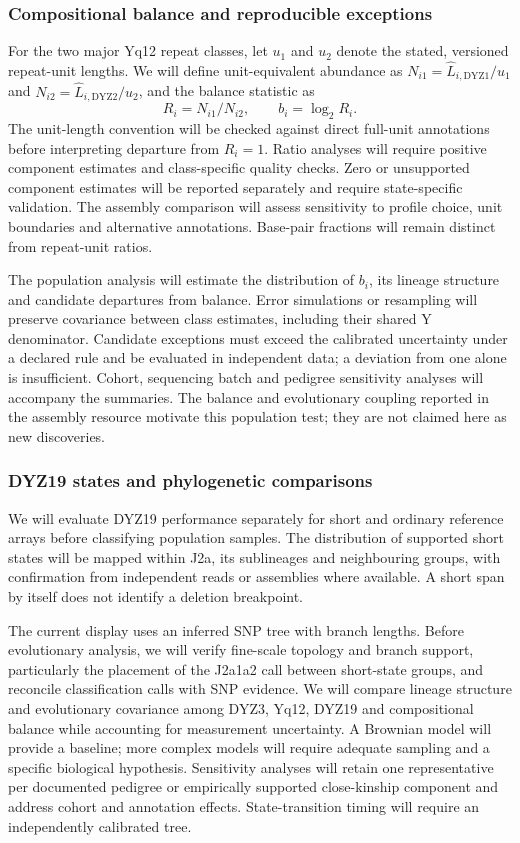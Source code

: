 \subsubsection{Compositional balance and reproducible exceptions}
For the two major Yq12 repeat classes, let $u_1$ and $u_2$ denote the stated, versioned repeat-unit lengths. We will define unit-equivalent abundance as $N_{i1}=\widehat L_{i,\mathrm{DYZ1}}/u_1$ and $N_{i2}=\widehat L_{i,\mathrm{DYZ2}}/u_2$, and the balance statistic as
\begin{equation}
R_i=N_{i1}/N_{i2},\qquad b_i=\log_2 R_i.
\end{equation}
The unit-length convention will be checked against direct full-unit annotations before interpreting departure from $R_i=1$. Ratio analyses will require positive component estimates and class-specific quality checks. Zero or unsupported component estimates will be reported separately and require state-specific validation. The assembly comparison will assess sensitivity to profile choice, unit boundaries and alternative annotations. Base-pair fractions will remain distinct from repeat-unit ratios.

The population analysis will estimate the distribution of $b_i$, its lineage structure and candidate departures from balance. Error simulations or resampling will preserve covariance between class estimates, including their shared Y denominator. Candidate exceptions must exceed the calibrated uncertainty under a declared rule and be evaluated in independent data; a deviation from one alone is insufficient. Cohort, sequencing batch and pedigree sensitivity analyses will accompany the summaries. The balance and evolutionary coupling reported in the assembly resource \cite{Hallast2026} motivate this population test; they are not claimed here as new discoveries.

\subsubsection{DYZ19 states and phylogenetic comparisons}
We will evaluate DYZ19 performance separately for short and ordinary reference arrays before classifying population samples. The distribution of supported short states will be mapped within J2a, its sublineages and neighbouring groups, with confirmation from independent reads or assemblies where available. A short span by itself does not identify a deletion breakpoint.

The current display uses an inferred SNP tree with branch lengths. Before evolutionary analysis, we will verify fine-scale topology and branch support, particularly the placement of the J2a1a2 call between short-state groups, and reconcile classification calls with SNP evidence. We will compare lineage structure and evolutionary covariance among DYZ3, Yq12, DYZ19 and compositional balance while accounting for measurement uncertainty. A Brownian model will provide a baseline; more complex models will require adequate sampling and a specific biological hypothesis. Sensitivity analyses will retain one representative per documented pedigree or empirically supported close-kinship component and address cohort and annotation effects. State-transition timing will require an independently calibrated tree.


